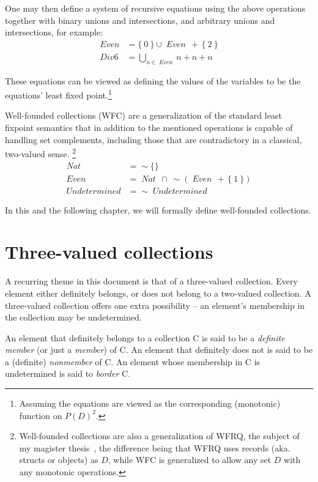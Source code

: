 \documentclass[oneside,12pt]{book}
\theoremstyle{definition}
\theoremstyle{remark}
\newcommand{\ct}{{\sim}} %
\newcommand\var[1]{\mathop{\mathit{#1}}\nolimits}
\newcommand{\pSet}{P}
\begin{document}
One may then define a system of recursive equations using the above operations
together with binary unions and intersections, and arbitrary unions and
intersections, for example:
%
\begin{align*}
  \var{Even} &= \{~0~\} \cup \var{Even}\,+\,\{~2~\} \\
  \var{Div6} &= \bigcup_{n \in \var{Even}}n + n + n
\end{align*}

These equations can be viewed as defining the values of the variables to be the
equations' least fixed point.\footnote{Assuming the equations are viewed as
the corresponding (monotonic) function on $\pSet(D)^2$.}

Well-founded collections (WFC) are a generalization of the standard least fixpoint
semantics that in addition to the mentioned operations is capable of handling
set complements, including those that are contradictory in a classical,
two-valued sense.%
%
\footnote{Well-founded collections are also a generalization of WFRQ, the subject
of my magister thesis~\cite{MikusinecMgrThesis}, the difference being that WFRQ
uses records (aka. structs or objects) as $D$, while WFC is generalized to allow
any set $D$ with any monotonic operations.}
%
\begin{align*}
  \var{Nat} &= \ct\{\} \\
  \var{Even} &= \var{Nat}\,\cap~\ct(\var{Even}\,+\,\{~1~\}) \\
  \var{Undetermined} &= \ct\var{Undetermined}
\end{align*}

In this and the following chapter, we will formally define well-founded collections.

\section{Three-valued collections}
A recurring theme in this document is that of a three-valued collection.
Every element either definitely belongs, or does not belong to a two-valued collection.
A three-valued collection offers one extra possibility -- an element's membership in the
collection may be undetermined.

An element that definitely belongs to a collection C is said to be a \textit{definite
member} (or just a \textit{member}) of C. An element that definitely does not is
said to be a (definite) \textit{nonmember} of C. An element whose membership in C
is undetermined is said to \textit{border} C.
\end{document}
